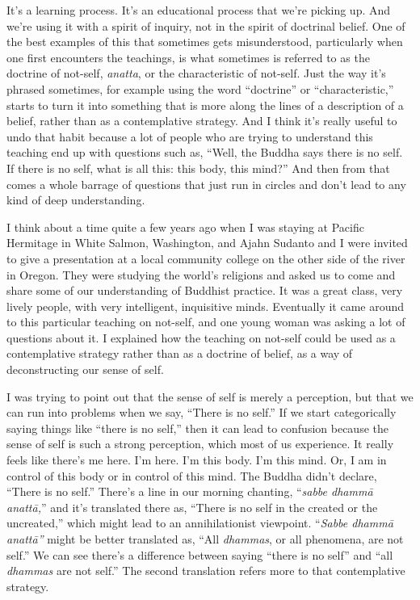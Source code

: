 It's a learning process. It's an educational process that we're picking up. And we're using it with a spirit of inquiry, not in the spirit of doctrinal belief. One of the best examples of this that sometimes gets misunderstood, particularly when one first encounters the teachings, is what sometimes is referred to as the doctrine of not-self, \emph{anatta}, or the characteristic of not-self. Just the way it's phrased sometimes, for example using the word ``doctrine'' or ``characteristic,'' starts to turn it into something that is more along the lines of a description of a belief, rather than as a contemplative strategy. And I think it's really useful to undo that habit because a lot of people who are trying to understand this teaching end up with questions such as, ``Well, the Buddha says there is no self. If there is no self, what is all this: this body, this mind?'' And then from that comes a whole barrage of questions that just run in circles and don't lead to any kind of deep understanding.~

I think about a time quite a few years ago when I was staying at Pacific Hermitage in White Salmon, Washington, and Ajahn Sudanto and I were invited to give a presentation at a local community college on the other side of the river in Oregon. They were studying the world's religions and asked us to come and share some of our understanding of Buddhist practice. It was a great class, very lively people, with very intelligent, inquisitive minds. Eventually it came around to this particular teaching on not-self, and one young woman was asking a lot of questions about it. I explained how the teaching on not-self could be used as a contemplative strategy rather than as a doctrine of belief, as a way of deconstructing our sense of self.~

I was trying to point out that the sense of self is merely a perception, but that we can run into problems when we say, ``There is no self.'' If we start categorically saying things like ``there is no self,'' then it can lead to confusion because the sense of self is such a strong perception, which most of us experience. It really feels like there's me here. I'm here. I'm this body. I'm this mind. Or, I am in control of this body or in control of this mind. The Buddha didn't declare, ``There is no self.'' There's a line in our morning chanting, ``\emph{sabbe dhammā anattā,}'' and it's translated there as, ``There is no self in the created or the uncreated,'' which might lead to an annihilationist viewpoint. ``\emph{Sabbe dhammā anattā''} might be better translated as, ``All \emph{dhammas}, or all phenomena, are not self.'' We can see there's a difference between saying ``there is no self'' and ``all \emph{dhammas} are not self.'' The second translation refers more to that contemplative strategy.

